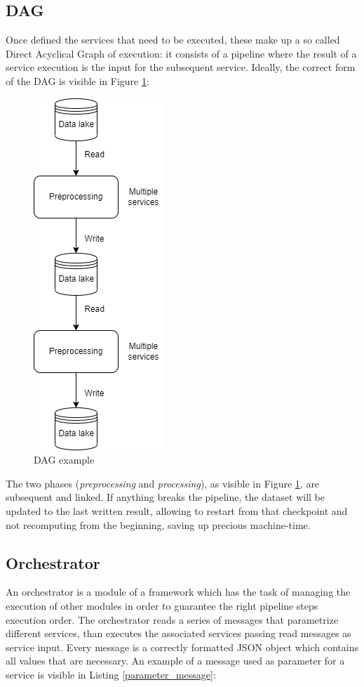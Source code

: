 \documentclass[\main/main.tex]{subfiles}
\begin{document}
\subsection{DAG}
Once defined the services that need to be executed, these make up a so called Direct Acyclical Graph of execution: it consists of a pipeline where the result of a service execution is the input for the subsequent service. Ideally, the correct form of the DAG is visible in Figure \ref{fig:dag_example}:
\begin{figure}[H]
    \centering
    \includegraphics[scale=.68]{images/architecture/dag_theory.png}
    \caption{DAG example}
    \label{fig:dag_example}
\end{figure}
The two phases (\emph{preprocessing} and \emph{processing}), as visible in Figure \ref{fig:dag_example}, are subsequent and linked. If anything breaks the pipeline, the dataset will be updated to the last written result, allowing to restart from that checkpoint and not recomputing from the beginning, saving up precious machine-time.
\subsection{Orchestrator}
An orchestrator is a module of a framework which has the task of managing the execution of other modules in order to guarantee the right pipeline steps execution order. The orchestrator reads a series of messages that parametrize different services, than executes the associated services passing read messages as service input. Every message is a correctly formatted JSON object which contains all values that are necessary. An example of a message used as parameter for a service is visible in Listing \ref{parameter_message}:
\end{document}
